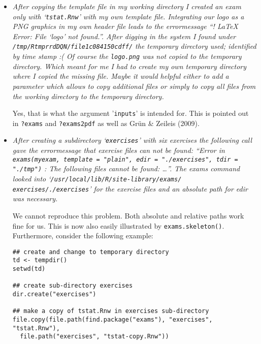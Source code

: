 \documentclass[american]{uibkletter}
\begin{document}
\begin{itemize}
Third, the manuscript now recommends explicitly not to start with customization
of a specific layout in {\LaTeX} but to rather start by creating some (simple)
.Rnw exercises and rendering them into different output formats. Adaptation
of existing .Rnw exercises should hopefully be easier after creating local
copies in a directory via \texttt{exams.skeleton()}.

\item {\it
After copying the template file in my working directory I created an exam
only with `\texttt{tstat.Rnw}' with my own template file.  Integrating our logo as
a PNG graphics in my own header file leads to the errormessage ``!  LaTeX
Error: File `logo' not found.''.  After digging in the system I found under
\texttt{/tmp/RtmprrdDQN/file1c084150cdff/} the temporary directory used; identified
by time stamp :( Of course the \texttt{logo.png} was not copied to the temporary
directory.  Which meant for me I had to create my own temporary directory
where I copied the missing file.  Maybe it would helpful either to add a
parameter which allows to copy additional files or simply to copy all
files from the working directory to the temporary directory.}

Yes, that is what the argument '\texttt{inputs}' is intended for. This is pointed out
in \texttt{?exams} and \texttt{?exams2pdf} as well as Gr\"un \& Zeileis (2009).

\item {\it
After creating a subdirectory `\texttt{exercises}' with six exercises the following
call gave the errormessage that exercise files can not be found: ``Error in
\texttt{exams(myexam, template = "plain", edir = "./exercises", tdir = "./tmp")} :
The following files cannot be found: \dots''.  The exams command looked into
`\texttt{/usr/local/lib/R/site-library/exams/} \texttt{exercises/./exercises}' for the
exercise files and an absolute path for edir was necessary.}

We cannot reproduce this problem. Both absolute and relative paths work fine
for us. This is now also easily illustrated by \texttt{exams.skeleton()}. Furthermore,
consider the following example:
\begin{verbatim}
## create and change to temporary directory
td <- tempdir()
setwd(td)

## create sub-directory exercises
dir.create("exercises")

## make a copy of tstat.Rnw in exercises sub-directory
file.copy(file.path(find.package("exams"), "exercises", "tstat.Rnw"),
  file.path("exercises", "tstat-copy.Rnw"))


\end{verbatim}
\end{itemize}
\end{document}
